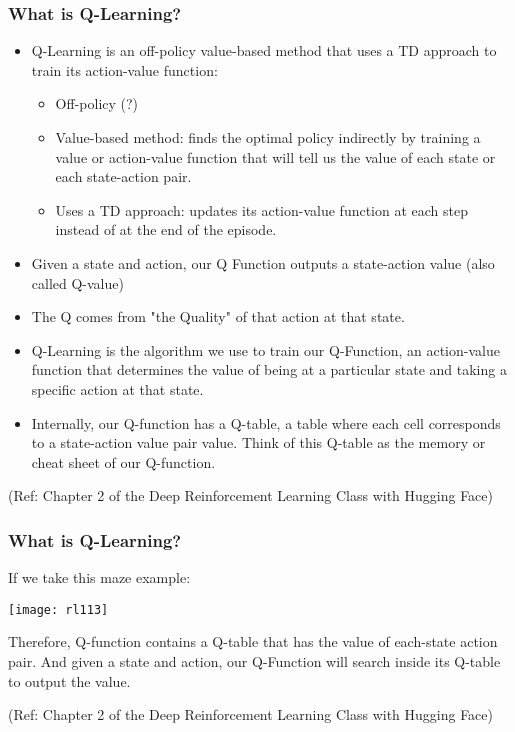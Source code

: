 \begin{frame}[fragile]\frametitle{What is Q-Learning?}

\begin{itemize}

\item Q-Learning is an off-policy value-based method that uses a TD approach to train its action-value function:


\begin{itemize}
\item Off-policy (?)
\item Value-based method: finds the optimal policy indirectly by training a value or action-value function that will tell us the value of each state or each state-action pair.
\item Uses a TD approach: updates its action-value function at each step instead of at the end of the episode.
\end{itemize}

\item Given a state and action, our Q Function outputs a state-action value (also called Q-value)
\item The Q comes from "the Quality" of that action at that state.
\item Q-Learning is the algorithm we use to train our Q-Function, an action-value function that determines the value of being at a particular state and taking a specific action at that state.
\item Internally, our Q-function has a Q-table, a table where each cell corresponds to a state-action value pair value. Think of this Q-table as the memory or cheat sheet of our Q-function.
\end{itemize}

{\tiny (Ref: Chapter 2 of the Deep Reinforcement Learning Class with Hugging Face)}

\end{frame}

\begin{frame}[fragile]\frametitle{What is Q-Learning?}

If we take this maze example:
\begin{center}
\texttt{[image: rl113]}
\end{center}

Therefore, Q-function contains a Q-table that has the value of each-state action pair. And given a state and action, our Q-Function will search inside its Q-table to output the value.

{\tiny (Ref: Chapter 2 of the Deep Reinforcement Learning Class with Hugging Face)}

\end{frame}


